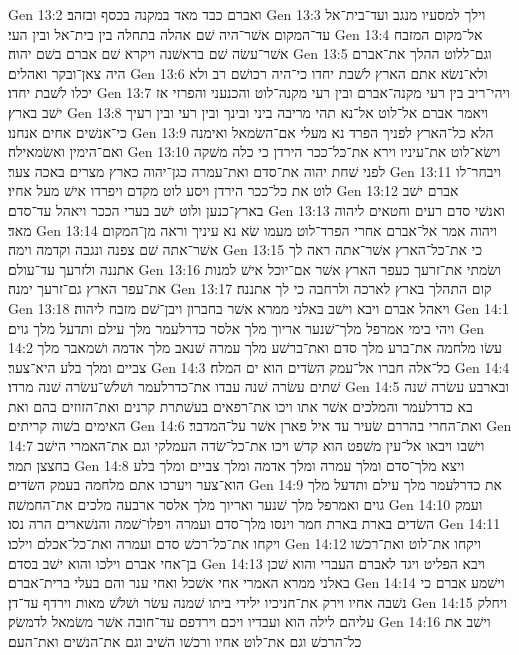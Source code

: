 Gen 13:2  ואברם כבד מאד במקנה בכסף ובזהב׃
Gen 13:3  וילך למסעיו מנגב ועד־בית־אל עד־המקום אשׁר־היה שׁם אהלה בתחלה בין בית־אל ובין העי׃
Gen 13:4  אל־מקום המזבח אשׁר־עשׂה שׁם בראשׁנה ויקרא שׁם אברם בשׁם יהוה׃
Gen 13:5  וגם־ללוט ההלך את־אברם היה צאן־ובקר ואהלים׃
Gen 13:6  ולא־נשׂא אתם הארץ לשׁבת יחדו כי־היה רכושׁם רב ולא יכלו לשׁבת יחדו׃
Gen 13:7  ויהי־ריב בין רעי מקנה־אברם ובין רעי מקנה־לוט והכנעני והפרזי אז ישׁב בארץ׃
Gen 13:8  ויאמר אברם אל־לוט אל־נא תהי מריבה ביני ובינך ובין רעי ובין רעיך כי־אנשׁים אחים אנחנו׃
Gen 13:9  הלא כל־הארץ לפניך הפרד נא מעלי אם־השׂמאל ואימנה ואם־הימין ואשׂמאילה׃
Gen 13:10  וישׂא־לוט את־עיניו וירא את־כל־ככר הירדן כי כלה משׁקה לפני שׁחת יהוה את־סדם ואת־עמרה כגן־יהוה כארץ מצרים באכה צער׃
Gen 13:11  ויבחר־לו לוט את כל־ככר הירדן ויסע לוט מקדם ויפרדו אישׁ מעל אחיו׃
Gen 13:12  אברם ישׁב בארץ־כנען ולוט ישׁב בערי הככר ויאהל עד־סדם׃
Gen 13:13  ואנשׁי סדם רעים וחטאים ליהוה מאד׃
Gen 13:14  ויהוה אמר אל־אברם אחרי הפרד־לוט מעמו שׂא נא עיניך וראה מן־המקום אשׁר־אתה שׁם צפנה ונגבה וקדמה וימה׃
Gen 13:15  כי את־כל־הארץ אשׁר־אתה ראה לך אתננה ולזרעך עד־עולם׃
Gen 13:16  ושׂמתי את־זרעך כעפר הארץ אשׁר אם־יוכל אישׁ למנות את־עפר הארץ גם־זרעך ימנה׃
Gen 13:17  קום התהלך בארץ לארכה ולרחבה כי לך אתננה׃
Gen 13:18  ויאהל אברם ויבא וישׁב באלני ממרא אשׁר בחברון ויבן־שׁם מזבח ליהוה׃
Gen 14:1  ויהי בימי אמרפל מלך־שׁנער אריוך מלך אלסר כדרלעמר מלך עילם ותדעל מלך גוים׃
Gen 14:2  עשׂו מלחמה את־ברע מלך סדם ואת־ברשׁע מלך עמרה שׁנאב מלך אדמה ושׁמאבר מלך צביים ומלך בלע היא־צער׃
Gen 14:3  כל־אלה חברו אל־עמק השׂדים הוא ים המלח׃
Gen 14:4  שׁתים עשׂרה שׁנה עבדו את־כדרלעמר ושׁלשׁ־עשׂרה שׁנה מרדו׃
Gen 14:5  ובארבע עשׂרה שׁנה בא כדרלעמר והמלכים אשׁר אתו ויכו את־רפאים בעשׁתרת קרנים ואת־הזוזים בהם ואת האימים בשׁוה קריתים׃
Gen 14:6  ואת־החרי בהררם שׂעיר עד איל פארן אשׁר על־המדבר׃
Gen 14:7  וישׁבו ויבאו אל־עין משׁפט הוא קדשׁ ויכו את־כל־שׂדה העמלקי וגם את־האמרי הישׁב בחצצן תמר׃
Gen 14:8  ויצא מלך־סדם ומלך עמרה ומלך אדמה ומלך צביים ומלך בלע הוא־צער ויערכו אתם מלחמה בעמק השׂדים׃
Gen 14:9  את כדרלעמר מלך עילם ותדעל מלך גוים ואמרפל מלך שׁנער ואריוך מלך אלסר ארבעה מלכים את־החמשׁה׃
Gen 14:10  ועמק השׂדים בארת בארת חמר וינסו מלך־סדם ועמרה ויפלו־שׁמה והנשׁארים הרה נסו׃
Gen 14:11  ויקחו את־כל־רכשׁ סדם ועמרה ואת־כל־אכלם וילכו׃
Gen 14:12  ויקחו את־לוט ואת־רכשׁו בן־אחי אברם וילכו והוא ישׁב בסדם׃
Gen 14:13  ויבא הפליט ויגד לאברם העברי והוא שׁכן באלני ממרא האמרי אחי אשׁכל ואחי ענר והם בעלי ברית־אברם׃
Gen 14:14  וישׁמע אברם כי נשׁבה אחיו וירק את־חניכיו ילידי ביתו שׁמנה עשׂר ושׁלשׁ מאות וירדף עד־דן׃
Gen 14:15  ויחלק עליהם לילה הוא ועבדיו ויכם וירדפם עד־חובה אשׁר משׂמאל לדמשׂק׃
Gen 14:16  וישׁב את כל־הרכשׁ וגם את־לוט אחיו ורכשׁו השׁיב וגם את־הנשׁים ואת־העם׃
